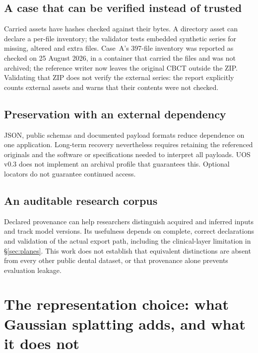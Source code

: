 \documentclass[11pt,a4paper]{article}
\begin{document}
\subsection{A case that can be verified instead of trusted}


Carried assets have hashes checked against their bytes. A directory asset can declare a
per-file inventory; the validator tests embedded synthetic series for missing, altered and
extra files. Case~A's 397-file inventory was reported as checked on 25 August 2026, in a
container that carried the files and was not archived; the reference writer now leaves the
original CBCT outside the ZIP. Validating that ZIP does not verify the
external series: the report explicitly counts external assets and warns that their contents
were not checked.

\subsection{Preservation with an external dependency}

JSON, public schemas and documented payload formats reduce dependence on one application.
Long-term recovery nevertheless requires retaining the referenced originals and the software
or specifications needed to interpret all payloads. UOS v0.3 does not implement an archival
profile that guarantees this. Optional locators do not guarantee continued access.

\subsection{An auditable research corpus}

Declared provenance can help researchers distinguish acquired and inferred inputs and track
model versions. Its usefulness depends on complete, correct declarations and validation of
the actual export path, including the clinical-layer limitation in \S\ref{sec:planes}.
This work does not establish that equivalent distinctions are absent from every other
public dental dataset, or that provenance alone prevents evaluation leakage.


\section{The representation choice: what Gaussian splatting adds, and what it does not}
\label{sec:gs}
\end{document}
